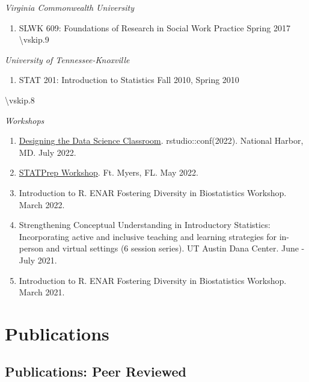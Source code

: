 \documentclass[11pt,dvipsnames]{article}
\providecommand{\tightlist}{%
  \setlength{\itemsep}{0pt}\setlength{\parskip}{0pt}}
\begin{document}
\emph{Virginia Commonwealth University}

\begin{enumerate}
\def\labelenumi{\arabic{enumi}.}
\setcounter{enumi}{5}
\tightlist
\item
  SLWK 609: Foundations of Research in Social Work Practice \hfill
  Spring 2017 \textbackslash vskip.9\baselineskip
\end{enumerate}

\emph{University of Tennessee-Knoxville}

\begin{enumerate}
\def\labelenumi{\arabic{enumi}.}
\setcounter{enumi}{6}
\tightlist
\item
  STAT 201: Introduction to Statistics \hfill Fall 2010, Spring 2010
\end{enumerate}

\textbackslash vskip.8\baselineskip

\emph{Workshops}

\begin{enumerate}
\def\labelenumi{\arabic{enumi}.}
\setcounter{enumi}{7}
\item
  \href{https://rstudio-conf-2022.github.io/teach-ds/}{Designing the
  Data Science Classroom}. rstudio::conf(2022). National Harbor, MD.
  July 2022.
\item
  \href{http://www.statprep.org/Summer_2022_workshop.html}{STATPrep
  Workshop}. Ft. Myers, FL. May 2022.
\item
  Introduction to R. ENAR Fostering Diversity in Biostatistics Workshop.
  March 2022.
\item
  Strengthening Conceptual Understanding in Introductory Statistics:
  Incorporating active and inclusive teaching and learning strategies
  for in-person and virtual settings (6 session series). UT Austin Dana
  Center. June - July 2021.
\item
  Introduction to R. ENAR Fostering Diversity in Biostatistics Workshop.
  March 2021.
\end{enumerate}

\section{Publications}\label{publications}

\subsection{Publications: Peer
Reviewed}\label{publications-peer-reviewed}
\end{document}
